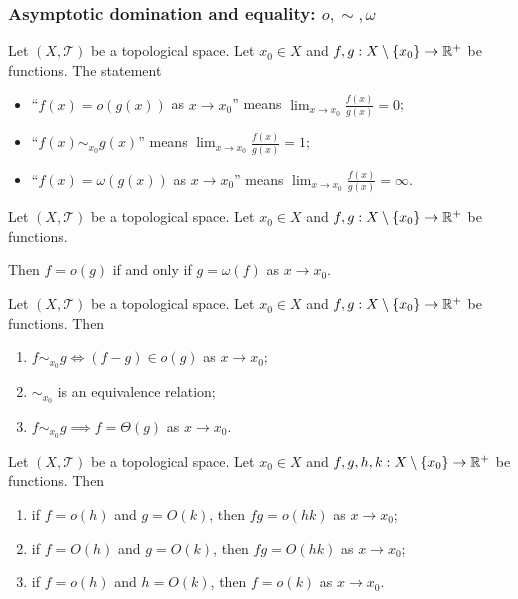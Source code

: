 \subsubsection{Asymptotic domination and equality: $o,\sim,\omega$}
\begin{definition}
Let $(X,\mathcal{T})$ be a topological space. Let $x_0 \in X$ and $f,g: X\setminus\{x_0\}\to \mathbb{R}^+$ be functions. The statement
\begin{itemize}
\item ``$f(x) = o(g(x))$ as $x\to x_0$'' means $\lim_{x\to x_0} \frac{f(x)}{g(x)} = 0$;
\item ``$f(x) \sim_{x_0} g(x)$'' means $\lim_{x\to x_0} \frac{f(x)}{g(x)} = 1$;
\item ``$f(x) = \omega(g(x))$ as $x\to x_0$'' means $\lim_{x\to x_0} \frac{f(x)}{g(x)} = \infty$.
\end{itemize}
\end{definition}

\begin{lemma}
Let $(X,\mathcal{T})$ be a topological space. Let $x_0 \in X$ and $f,g: X\setminus\{x_0\}\to \mathbb{R}^+$ be functions.

Then $f = o(g)$ \textup{if and only if} $g = \omega(f)$ as $x\to x_0$.
\end{lemma}

\begin{lemma}
Let $(X,\mathcal{T})$ be a topological space. Let $x_0 \in X$ and $f,g: X\setminus\{x_0\}\to \mathbb{R}^+$ be functions. Then
\begin{enumerate}
\item $f\sim_{x_0} g \iff (f-g)\in o(g)$ as $x\to x_0$;
\item $\sim_{x_0}$ is an equivalence relation;
\item $f \sim_{x_0} g \implies f = \Theta(g)$ as $x\to x_0$.
\end{enumerate}
\end{lemma}

\begin{lemma}
Let $(X,\mathcal{T})$ be a topological space. Let $x_0 \in X$ and $f,g, h,k: X\setminus\{x_0\}\to \mathbb{R}^+$ be functions. Then
\begin{enumerate}
\item if $f = o(h)$ and $g = O(k)$, then $fg = o(hk)$ as $x\to x_0$;
\item if $f = O(h)$ and $g = O(k)$, then $fg = O(hk)$ as $x\to x_0$;
\item if $f = o(h)$ and $h = O(k)$, then $f = o(k)$ as $x\to x_0$.
\end{enumerate}
\end{lemma}

